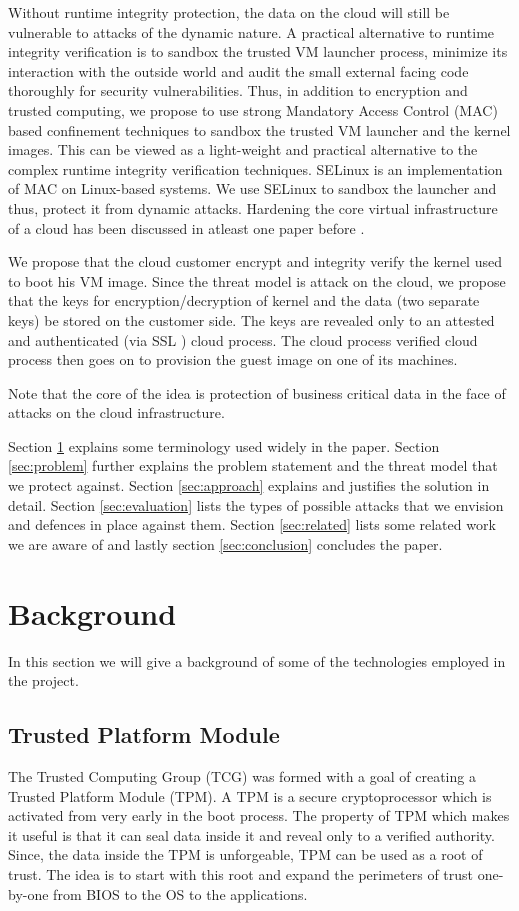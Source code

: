 \documentclass[10pt,twocolumn,pdftex]{article}
\begin{document}
Without runtime integrity protection, the data on the cloud will still be vulnerable to attacks of the dynamic nature. A practical alternative to runtime integrity verification is to sandbox the trusted VM launcher process, minimize its interaction with the outside world and audit the small external facing code thoroughly for security vulnerabilities. Thus, in addition to encryption and trusted computing, we propose to use strong Mandatory Access Control (MAC) based confinement techniques to sandbox the trusted VM launcher and the kernel images. This can be viewed as a light-weight and practical alternative to the complex runtime integrity verification techniques. SELinux \cite{SELinux} is an implementation of MAC on Linux-based systems. We use SELinux to sandbox the launcher and thus, protect it from dynamic attacks. Hardening the core virtual infrastructure of a cloud has been discussed in atleast one paper before \cite{secure-cloud-core}. 

We propose that the cloud customer encrypt and integrity verify the kernel used to boot his VM image. Since the threat model is attack on the cloud, we propose that the keys for encryption/decryption of kernel and the data (two separate keys) be stored on the customer side. The keys are revealed only to an attested and authenticated (via SSL \cite{SSL}) cloud process. The cloud process verified cloud process then goes on to provision the guest image on one of its machines.

Note that the core of the idea is protection of business critical data in the face of attacks on the cloud infrastructure.

Section \ref{sec:background} explains some terminology used widely in the paper. Section \ref{sec:problem} further explains the problem statement and the threat model that we protect against. Section \ref{sec:approach} explains and justifies the solution in detail. Section \ref{sec:evaluation} lists the types of possible attacks that we envision and defences in place against them. Section \ref{sec:related} lists some related work we are aware of and lastly section \ref{sec:conclusion} concludes the paper.

\section{Background}
\label{sec:background}
In this section we will give a background of some of the technologies employed in the project.

\subsection{Trusted Platform Module}
The Trusted Computing Group (TCG) \cite{TCG} was formed with a goal of creating a Trusted Platform Module (TPM). A TPM is a secure cryptoprocessor which is activated from very early in the boot process. The property of TPM which makes it useful is that it can seal data inside it and reveal only to a verified authority. Since, the data inside the TPM is unforgeable, TPM can be used as a root of trust. The idea is to start with this root and expand the perimeters of trust one-by-one from BIOS to the OS to the applications.
\end{document}
